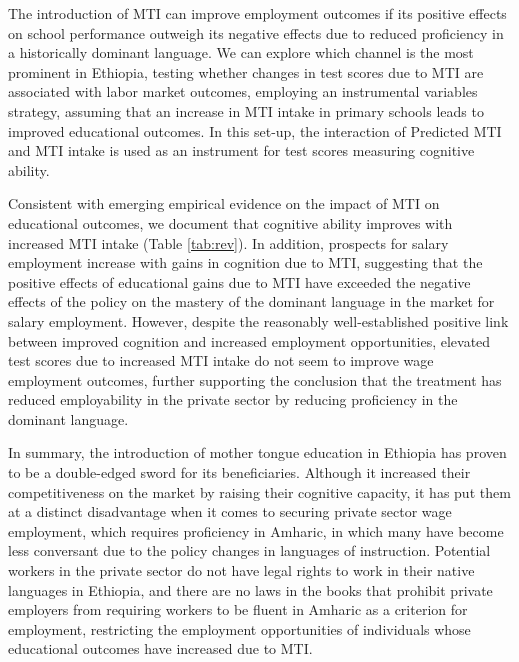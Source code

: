 The introduction of MTI can improve employment outcomes if its positive effects on school performance outweigh its negative effects due to reduced proficiency in a historically dominant language. We can explore which channel is the most prominent in Ethiopia, testing whether changes in test scores due to MTI are associated with labor market outcomes, employing an instrumental variables strategy, assuming that an increase in MTI intake in primary schools leads to improved educational outcomes. In this set-up, the interaction of Predicted MTI and MTI intake is used as an instrument for test scores measuring cognitive ability. 

Consistent with emerging empirical evidence on the impact of MTI on educational outcomes, we document that cognitive ability improves with increased MTI intake (Table \ref{tab:rev}). In addition, prospects for salary employment increase with gains in cognition due to MTI, suggesting that the positive effects of educational gains due to MTI have exceeded the negative effects of the policy on the mastery of the dominant language in the market for salary employment. However, despite the reasonably well-established positive link between improved cognition and increased employment opportunities, elevated test scores due to increased MTI intake do not seem to improve wage employment outcomes, further supporting the conclusion that the treatment has reduced employability in the private sector by reducing proficiency in the dominant language. 



In summary, the introduction of mother tongue education in Ethiopia has proven to be a double-edged sword for its beneficiaries. Although it increased their competitiveness on the market by raising their cognitive capacity, it has put them at a distinct disadvantage when it comes to securing private sector wage employment, which requires proficiency in Amharic, in which many have become less conversant due to the policy changes in languages of instruction. Potential workers in the private sector do not have legal rights to work in their native languages in Ethiopia, and there are no laws in the books that prohibit private employers from requiring workers to be fluent in Amharic as a criterion for employment, restricting the employment opportunities of individuals whose educational outcomes have increased due to MTI. 

  



